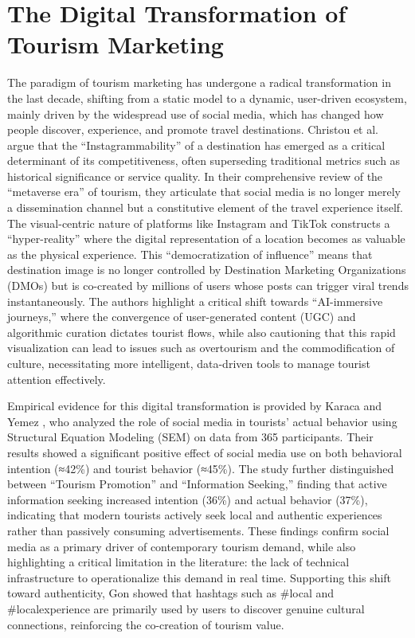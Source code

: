 \documentclass[a4paper,12pt]{report}
\begin{document}
\section{The Digital Transformation of Tourism Marketing}
The paradigm of tourism marketing has undergone a radical transformation in the last decade, shifting from a static model to a dynamic, user-driven ecosystem, mainly driven by the widespread use of social media, which has changed how people discover, experience, and promote travel destinations. Christou et al. \cite{christou2025} argue that the “Instagrammability” of a destination has emerged as a critical determinant of its competitiveness, often superseding traditional metrics such as historical significance or service quality. In their comprehensive review of the “metaverse era” of tourism, they articulate that social media is no longer merely a dissemination channel but a constitutive element of the travel experience itself. The visual-centric nature of platforms like Instagram and TikTok constructs a “hyper-reality” where the digital representation of a location becomes as valuable as the physical experience. This “democratization of influence” means that destination image is no longer controlled by Destination Marketing Organizations (DMOs) but is co-created by millions of users whose posts can trigger viral trends instantaneously. The authors highlight a critical shift towards “AI-immersive journeys,” where the convergence of user-generated content (UGC) and algorithmic curation dictates tourist flows, while also cautioning that this rapid visualization can lead to issues such as overtourism and the commodification of culture, necessitating more intelligent, data-driven tools to manage tourist attention effectively.

Empirical evidence for this digital transformation is provided by Karaca and Yemez \cite{karaca2022}, who analyzed the role of social media in tourists’ actual behavior using Structural Equation Modeling (SEM) on data from 365 participants. Their results showed a significant positive effect of social media use on both behavioral intention (≈42\%) and tourist behavior (≈45\%). The study further distinguished between “Tourism Promotion” and “Information Seeking,” finding that active information seeking increased intention (36\%) and actual behavior (37\%), indicating that modern tourists actively seek local and authentic experiences rather than passively consuming advertisements. These findings confirm social media as a primary driver of contemporary tourism demand, while also highlighting a critical limitation in the literature: the lack of technical infrastructure to operationalize this demand in real time. Supporting this shift toward authenticity, Gon \cite{gon2020} showed that hashtags such as \#local and \#localexperience are primarily used by users to discover genuine cultural connections, reinforcing the co-creation of tourism value.
\end{document}
